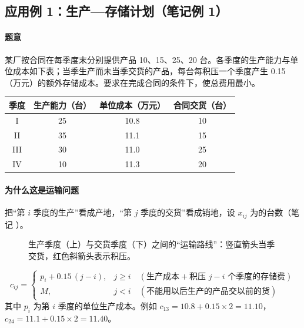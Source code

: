 \subsection{应用例 1：生产—存储计划（笔记例 1）}
\paragraph{题意 \orig}
某厂按合同在每季度末分别提供产品 10、15、25、20 台。各季度的生产能力与单位成本如下表；当季生产而未当季交货的产品，每台每积压一个季度产生 0.15（万元）的额外存储成本。要求在完成合同的条件下，使总费用最小。
\begin{center}\small
\begin{tabular}{@{}cccc@{}}
\toprule
季度 & 生产能力（台） & 单位成本（万元） & 合同交货（台）\\
\midrule
I & 25 & 10.8 & 10\\
II & 35 & 11.1 & 15\\
III & 30 & 11.0 & 25\\
IV & 10 & 11.3 & 20\\
\bottomrule
\end{tabular}
\end{center}

\paragraph{为什么这是运输问题}
把“第 $i$ 季度的生产”看成产地，“第 $j$ 季度的交货”看成销地，设 $x_{ij}$ 为的台数（笔记 \orig）。

\begin{figure}[H]
\centering
{}
\caption{生产季度（上）与交货季度（下）之间的“运输路线”：竖直箭头当季交货，红色斜箭头表示积压。}\label{fig:season}
\end{figure}
\begin{formulabox}
\[
c_{ij}=\begin{cases}p_i+0.15\,(j-i), & j\ge i\quad(\text{生产成本}+\text{积压 }j-i\text{ 个季度的存储费})\\ M, & j<i\quad(\text{不能用以后生产的产品交以前的货})\end{cases}
\]
其中 $p_i$ 为第 $i$ 季度的单位生产成本。例如 $c_{13}=10.8+0.15\times2=11.10$，$c_{24}=11.1+0.15\times2=11.40$。
\end{formulabox}


